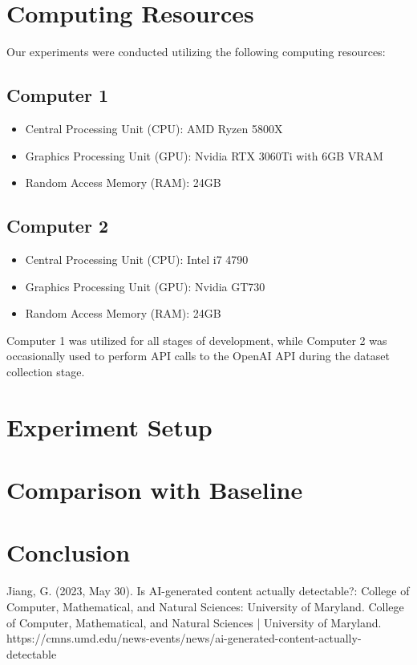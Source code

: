 \documentclass{article}
\begin{document}
\section{Computing Resources}
Our experiments were conducted utilizing the following computing resources:

\subsection{Computer 1}
\begin{itemize}
    \item Central Processing Unit (CPU): AMD Ryzen 5800X
    \item Graphics Processing Unit (GPU): Nvidia RTX 3060Ti with 6GB VRAM
    \item Random Access Memory (RAM): 24GB
\end{itemize}

\subsection{Computer 2}
\begin{itemize}
    \item Central Processing Unit (CPU): Intel i7 4790
    \item Graphics Processing Unit (GPU): Nvidia GT730
    \item Random Access Memory (RAM): 24GB
\end{itemize}

Computer 1 was utilized for all stages of development, while Computer 2 was occasionally used to perform API calls to the OpenAI API during the dataset collection stage.

\section{Experiment Setup}

\section{Comparison with Baseline}

\section{Conclusion}



Jiang, G. (2023, May 30). Is AI-generated content actually detectable?: College of Computer, Mathematical, and Natural Sciences: University of Maryland. College of Computer, Mathematical, and Natural Sciences | University of Maryland. https://cmns.umd.edu/news-events/news/ai-generated-content-actually-detectable 
\end{document}
